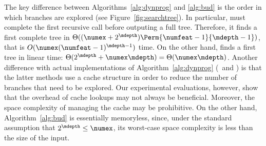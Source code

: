 \documentclass{article}
\begin{document}
			The key difference between Algorithms~\ref{alg:dynprog} and \ref{alg:bud} is the order in which branches are explored (see Figure~\ref{fig:searchtree}). In particular, \dynprog must complete the first recursive call before outputing a full tree. 
			Therefore, it finds a first complete tree in $\Theta((\numex+2^{\mdepth})\Perm{\numfeat-1}{\mdepth-1})$, that is $O(\numex(\numfeat-1)^{\mdepth-1})$ time. 	
			On the other hand, \blossom finds a first tree in linear time: $\Theta(2^{\mdepth}+\numex\mdepth) = \Theta(\numex\mdepth)$.
			Another difference with actual implementations of Algorithm~\ref{alg:dynprog} (\olddleight\ and \dleight) is that the latter methods use a cache structure in order to reduce the number of branches that need to be explored. 
			 Our experimental evaluations, however, show that the overhead of cache lookups may not always be beneficial. Moreover, the space complexity of managing the cache may be prohibitive. On the other hand, Algorithm~\ref{alg:bud} is essentially memoryless, since, under the standard assumption that $2^{\mdepth} \leq \numex$, its worst-case space complexity is less than the size of the input.
			
			
		
			
			
\end{document}
